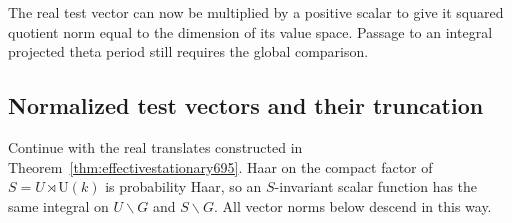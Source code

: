\documentclass[a4paper,11pt]{article}
\theoremstyle{definition}
\theoremstyle{remark}
\numberwithin{equation}{section}
\begin{document}
The real test vector can now be multiplied by a positive
scalar to give it squared quotient norm equal to the
dimension of its value space. Passage to an integral
projected theta period still requires the global comparison.


\subsection{Normalized test vectors and their truncation}
\label{sec:normalizedcut699}

Continue with the real translates constructed in
Theorem~\ref{thm:effectivestationary695}. Haar on the
compact factor of \(S=U\rtimes\mathrm U(k)\) is probability
Haar, so an \(S\)-invariant scalar function has the same
integral on \(U\backslash G\) and \(S\backslash G\).
All vector norms below descend in this way.
\end{document}

